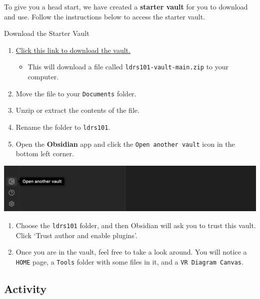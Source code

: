 \documentclass[
]{book}
\providecommand{\tightlist}{%
  \setlength{\itemsep}{0pt}\setlength{\parskip}{0pt}}
\theoremstyle{definition}
\theoremstyle{definition}
\theoremstyle{definition}
\theoremstyle{definition}
\theoremstyle{remark}
\begin{document}
To give you a head start, we have created a \textbf{starter vault} for you to download and use. Follow the instructions below to access the starter vault.

\begin{reflect}
{Download the Starter Vault}

\begin{enumerate}
\def\labelenumi{\arabic{enumi}.}
\tightlist
\item
  \href{https://github.com/twu-innovation/ldrs101-vault/archive/refs/heads/main.zip}{Click this link to download the vault.}

  \begin{itemize}
  \tightlist
  \item
    This will download a file called \texttt{ldrs101-vault-main.zip} to your computer.
  \end{itemize}
\item
  Move the file to your \texttt{Documents} folder.
\item
  Unzip or extract the contents of the file.
\item
  Rename the folder to \texttt{ldrs101}.
\item
  Open the \textbf{Obsidian} app and click the \texttt{Open\ another\ vault} icon in the bottom left corner.
\end{enumerate}

\includegraphics{assets/digital-literacy/obsidian2.png}

\begin{enumerate}
\def\labelenumi{\arabic{enumi}.}
\setcounter{enumi}{5}
\tightlist
\item
  Choose the \texttt{ldrs101} folder, and then Obsidian will ask you to trust this vault. Click `Trust author and enable plugins'.
\item
  Once you are in the vault, feel free to take a look around. You will notice a \texttt{HOME} page, a \texttt{Tools} folder with some files in it, and a \texttt{VR\ Diagram\ Canvas}.
\end{enumerate}
\end{reflect}

\hypertarget{activity-2}{%
\subsection*{Activity}\label{activity-2}}
\end{document}
